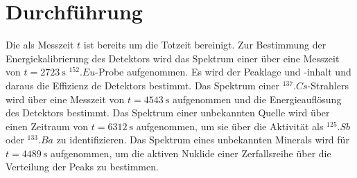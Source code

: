 \section{Durchführung}
\label{sec:Durchführung}
Die als Messzeit $t$ ist bereits um die Totzeit bereinigt.
Zur Bestimmung der Energiekalibrierung des Detektors wird das Spektrum einer über eine Messzeit von $t=\SI{2723}{\second}$ $^{152}.{Eu}$-Probe aufgenommen.
Es wird der Peaklage und -inhalt und daraus die Effizienz de Detektors bestimmt.
Das Spektrum einer $^{137}.{Cs}$-Strahlers wird über eine Messzeit von $t=\SI{4543}{\second}$ aufgenommen und die Energieauflösung des Detektors bestimmt.
Das Spektrum einer unbekannten Quelle wird über einen Zeitraum von $t=\SI{6312}{\second}$ aufgenommen, um sie über die Aktivität als $^{125}.{Sb}$ oder $^{133}.{Ba}$ zu identifizieren.
Das Spektrum eines unbekannten Minerals wird für $t=\SI{4489}{\second} $ aufgenommen, um die aktiven Nuklide einer Zerfallsreihe über die Verteilung der Peaks zu bestimmen.


